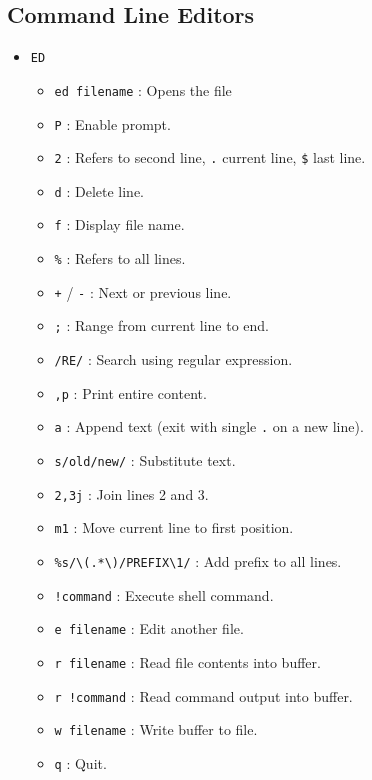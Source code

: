 \documentclass[a4paper,12pt=]{article}
\begin{document}
\subsection{Command Line Editors}
    \begin{itemize}
        \item \texttt{ED}
            \begin{itemize}
                \item \texttt{ed filename} : Opens the file
                \item \texttt{P} : Enable prompt.
                \item \texttt{2} : Refers to second line, \texttt{.} current line, \texttt{\$} last line.
                \item \texttt{d} : Delete line.
                \item \texttt{f} : Display file name.
                \item \texttt{\%} : Refers to all lines.
                \item \texttt{+} / \texttt{-} : Next or previous line.
                \item \texttt{;} : Range from current line to end.
                \item \texttt{/RE/} : Search using regular expression.
                \item \texttt{,p} : Print entire content.
                \item \texttt{a} : Append text (exit with single \texttt{.} on a new line).
                \item \texttt{s/old/new/} : Substitute text.
                \item \texttt{2,3j} : Join lines 2 and 3.
                \item \texttt{m1} : Move current line to first position.
                \item \texttt{\%s/\textbackslash(.*\textbackslash)/PREFIX\textbackslash1/} : Add prefix to all lines.
                \item \texttt{!command} : Execute shell command.
                \item \texttt{e filename} : Edit another file.
                \item \texttt{r filename} : Read file contents into buffer.
                \item \texttt{r !command} : Read command output into buffer.
                \item \texttt{w filename} : Write buffer to file.
                \item \texttt{q} : Quit.

\end{itemize}
\end{itemize}
\end{document}
